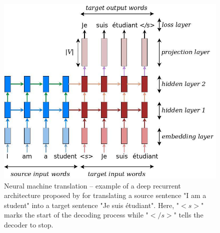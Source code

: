 \documentclass[a4paper,12pt]{report}
\begin{document}
\begin{figure}[H]
\begin{center}
\includegraphics[scale=.35]{seq2seq}
\caption{Neural machine translation – example of a deep recurrent architecture proposed by for translating a source sentence "I am a student" into a target sentence "Je suis étudiant". Here, "$<s>$" marks the start of the decoding process while "$</s>$" tells the decoder to stop.}
\end{center}
\end{figure}
\newpage
\end{document}
